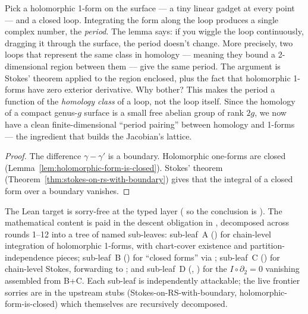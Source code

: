 \begin{layman}
Pick a holomorphic 1-form on the surface --- a tiny linear gadget at every
point --- and a closed loop. Integrating the form along the loop produces a
single complex number, the \emph{period}. The lemma says: if you wiggle
the loop continuously, dragging it through the surface, the period
doesn't change. More precisely, two loops that represent the same class
in homology --- meaning they bound a 2-dimensional region between them ---
give the same period. The argument is Stokes' theorem applied to the
region enclosed, plus the fact that holomorphic 1-forms have zero
exterior derivative. Why bother? This makes the period a function of the
\emph{homology class} of a loop, not the loop itself. Since the homology
of a compact genus-\(g\) surface is a small free abelian group of rank
\(2g\), we now have a clean finite-dimensional ``period pairing''
between homology and 1-forms --- the ingredient that builds the Jacobian's
lattice.
\end{layman}

\begin{proof}
The difference \(\gamma-\gamma'\) is a boundary. Holomorphic one-forms are
closed (Lemma~\ref{lem:holomorphic-form-is-closed}). Stokes' theorem
(Theorem~\ref{thm:stokes-on-rs-with-boundary}) gives that the integral of
a closed form over a boundary vanishes.
\end{proof}

\begin{proofsketch}
The Lean target
is sorry-free at the typed layer ( so
the conclusion is ). The mathematical content is paid
in the descent obligation
 in
, decomposed
across rounds 1--12 into a tree of named sub-leaves: sub-leaf~A
() for chain-level
integration of holomorphic 1-forms, with chart-cover existence and
partition-independence pieces; sub-leaf~B
() for ``closed
forms'' via ; sub-leaf~C
() for chain-level Stokes,
forwarding to ; and sub-leaf~D
(,
) for the
\(I \circ \partial_2 = 0\) vanishing assembled from B+C. Each
sub-leaf is independently attackable; the live frontier sorries are
in the upstream stubs (Stokes-on-RS-with-boundary,
holomorphic-form-is-closed) which themselves are recursively
decomposed.
\end{proofsketch}

